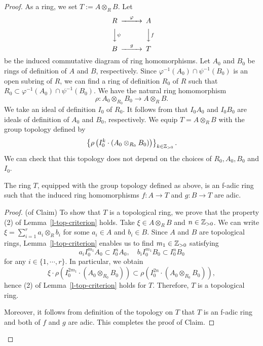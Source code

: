 \begin{proof}
As a ring, we set $T:=A \otimes_R B$. 
Let 
$$\begin{CD}
R @>\varphi >> A\\
@VV\psi V @VVfV\\
B @>g>> T
\end{CD}$$
be the induced commutative diagram of ring homomorphisms. 
Let $A_0$ and $B_0$ be rings of definition of $A$ and $B$, respectively. Since $\varphi^{-1}(A_0) \cap \psi^{-1}(B_0)$ is an open subring of $R$, 
we can find a ring of definition $R_0$ of $R$ 
such that $R_0 \subset \varphi^{-1}(A_0) \cap \psi^{-1}(B_0)$. 
We have the natural ring homomorphism 
$$\rho:A_0 \otimes_{R_0} B_0 \to A \otimes_R B.$$
We take an ideal of definition $I_0$ of $R_0$. 
It follows from \cite[Lemma 1.8(ii)]{Hub93} that $I_0A_0$ and $I_0B_0$ are 
ideals of definition of $A_0$ and $B_0$, respectively. 
We equip $T=A \otimes_R B$ with the group topology defined by 
$$\left\{\rho\left(I_0^k\cdot(A_0 \otimes_{R_0} B_0)\right)\right\}_{k \in \mathbb{Z}_{>0}}.$$ 
We can check that this topology does not depend 
on the choices of $R_0, A_0,  B_0$ and $I_0$. 


\begin{claim}
The ring $T$, equipped with the group topology defined as above, 
is an f-adic ring such that the induced ring homomorphisms $f:A \to T$ and $g:B \to T$ 
are adic.  
\end{claim}

\begin{proof}(of Claim) 
To show that $T$ is a topological ring, 
we prove that the property (2) of Lemma~\ref{l-top-criterion} holds. 
Take $\xi \in A \otimes_R B$ and $n \in \mathbb{Z}_{>0}$. 
We can write $\xi=\sum_{i=1}^r a_i \otimes_R b_i$ 
for some $a_i \in A$ and $b_i \in B$. 
Since $A$ and $B$ are topological rings, 
Lemma~\ref{l-top-criterion} enables us to find $m_1 \in \mathbb{Z}_{>0}$ satisfying  
$$a_i I_0^{m_1}A_0 \subset I_0^nA_0,\quad b_i I_0^{m_1}B_0 \subset I_0^nB_0$$ 
for any $i \in \{1, \cdots, r\}$. 
In particular, we obtain 
$$\xi \cdot \rho\left(I_0^{2m_1}\cdot(A_0 \otimes_{R_0} B_0)\right) 
\subset \rho\left(I_0^{2n}\cdot(A_0 \otimes_{R_0} B_0)\right),$$
hence (2) of Lemma~\ref{l-top-criterion} holds for $T$. 
Therefore, $T$ is a topological ring. 

Moreover, it follows from definition of the topology on $T$ 
that $T$ is an f-adic ring and both of $f$ and $g$ are adic. 
This completes the proof of Claim. 
\end{proof}


\end{proof}
